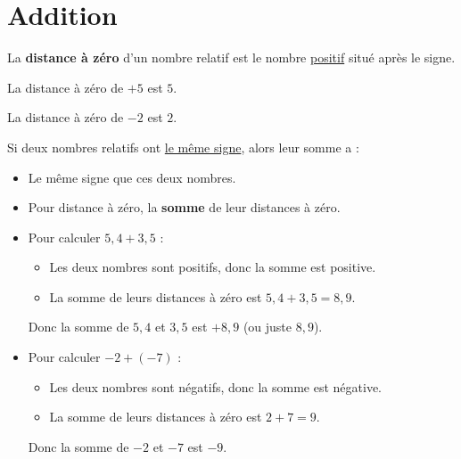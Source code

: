 \documentclass[../€Cours-complet/Cours-complet]{subfiles}
\begin{document}
\maketitleCours

\section{Addition}

\begin{greybox}[frametitle={Rappel}]
	La \textbf{distance à zéro} d'un nombre relatif est le nombre \uline{positif} situé après le signe.
\end{greybox}

\begin{exemple}
	La distance à zéro de $+5$ est $5$.

	La distance à zéro de $-2$ est $2$.
\end{exemple}

\begin{cours}
	Si deux nombres relatifs ont \uline{le même signe}, alors leur somme a :
	\begin{itemize}
		\item Le même signe que ces deux nombres.
		\item Pour distance à zéro, la \textbf{somme} de leur distances à zéro.
	\end{itemize}
\end{cours}

\begin{exemple}
	\begin{itemize}
		\item Pour calculer $5,4 + 3,5$ :
		      \begin{itemize}
			      \item Les deux nombres sont positifs, donc la somme est positive.
			      \item La somme de leurs distances à zéro est $5,4 + 3,5 = 8,9$.
		      \end{itemize}
		      Donc la somme de $5,4$ et $3,5$ est $+8,9$ (ou juste $8,9$).
		\item Pour calculer $-2 + (-7)$ :
		      \begin{itemize}
			      \item Les deux nombres sont négatifs, donc la somme est négative.
			      \item La somme de leurs distances à zéro est $2 + 7 = 9$.
		      \end{itemize}
		      Donc la somme de $-2$ et $-7$ est $-9$.
	\end{itemize}
\end{exemple}
\end{document}
